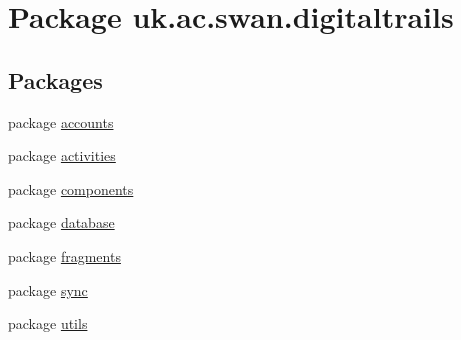 \hypertarget{namespaceuk_1_1ac_1_1swan_1_1digitaltrails}{\section{Package uk.\+ac.\+swan.\+digitaltrails}
\label{namespaceuk_1_1ac_1_1swan_1_1digitaltrails}
}
\subsection*{Packages}
\begin{DoxyCompactItemize}
\item 
package \hyperlink{namespaceuk_1_1ac_1_1swan_1_1digitaltrails_1_1accounts}{accounts}
\item 
package \hyperlink{namespaceuk_1_1ac_1_1swan_1_1digitaltrails_1_1activities}{activities}
\item 
package \hyperlink{namespaceuk_1_1ac_1_1swan_1_1digitaltrails_1_1components}{components}
\item 
package \hyperlink{namespaceuk_1_1ac_1_1swan_1_1digitaltrails_1_1database}{database}
\item 
package \hyperlink{namespaceuk_1_1ac_1_1swan_1_1digitaltrails_1_1fragments}{fragments}
\item 
package \hyperlink{namespaceuk_1_1ac_1_1swan_1_1digitaltrails_1_1sync}{sync}
\item 
package \hyperlink{namespaceuk_1_1ac_1_1swan_1_1digitaltrails_1_1utils}{utils}
\end{DoxyCompactItemize}
